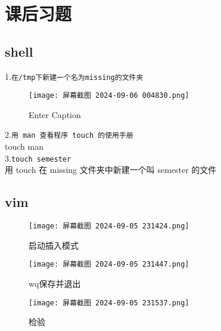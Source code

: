 \documentclass[a4paper,12pt]{article}
\begin{document}
 \section{\color{blue}课后习题}
 \subsection{shell}
 1.\texttt{在/tmp下新建一个名为missing的文件夹}\\
 \begin{figure}[H]
     \centering
     \texttt{[image: 屏幕截图 2024-09-06 004830.png]}
     \caption{Enter Caption}
     \label{fig:enter-label}
 \end{figure}
 2.\texttt{用 man 查看程序 touch 的使用手册}\\
 touch man\\
 3.\texttt{touch semester}\\
 用 touch 在 missing 文件夹中新建一个叫 semester 的文件\\

 \subsection{vim}
 \begin{figure}[H]
     \centering
     \texttt{[image: 屏幕截图 2024-09-05 231424.png]}
     \caption{启动插入模式}
     \label{fig:i启动插入模式}
 \end{figure}
 \begin{figure}[H]
     \centering
     \texttt{[image: 屏幕截图 2024-09-05 231447.png]}
     \caption{wq保存并退出}
     \label{fig:wq保存并退出}
 \end{figure}
 \begin{figure}[H]
     \centering
     \texttt{[image: 屏幕截图 2024-09-05 231537.png]}
     \caption{检验}
     \label{fig:检验}
 \end{figure}
\end{document}
